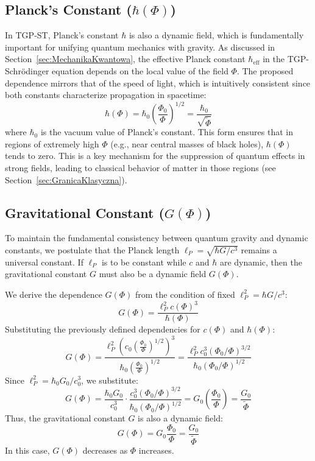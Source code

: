 \documentclass[11pt,a4paper]{article}
\begin{document}
\subsection{Planck’s Constant ($\hbar(\Phi)$)}
In TGP-ST, Planck’s constant $\hbar$ is also a dynamic field, which is fundamentally important for unifying quantum mechanics with gravity. As discussed in Section~\ref{sec:MechanikaKwantowa}, the effective Planck constant $\hbar_{\text{eff}}$ in the TGP-Schrödinger equation depends on the local value of the field $\Phi$. The proposed dependence mirrors that of the speed of light, which is intuitively consistent since both constants characterize propagation in spacetime:
\begin{equation}
    \hbar(\Phi) = \hbar_0 \left(\frac{\Phi_0}{\Phi}\right)^{1/2} = \frac{\hbar_0}{\sqrt{\tilde{\Phi}}}
    \label{eq:hbarPhi}
\end{equation}
where $\hbar_0$ is the vacuum value of Planck’s constant. This form ensures that in regions of extremely high $\Phi$ (e.g., near central masses of black holes), $\hbar(\Phi)$ tends to zero. This is a key mechanism for the suppression of quantum effects in strong fields, leading to classical behavior of matter in those regions (see Section~\ref{sec:GranicaKlasyczna}).

\subsection{Gravitational Constant ($G(\Phi)$)}
To maintain the fundamental consistency between quantum gravity and dynamic constants, we postulate that the Planck length $\ell_P = \sqrt{\hbar G / c^3}$ remains a universal constant. If $\ell_P$ is to be constant while $c$ and $\hbar$ are dynamic, then the gravitational constant $G$ must also be a dynamic field $G(\Phi)$.

We derive the dependence $G(\Phi)$ from the condition of fixed $\ell_P^2 = \hbar G / c^3$:
\[
    G(\Phi) = \frac{\ell_P^2 c(\Phi)^3}{\hbar(\Phi)}
\]
Substituting the previously defined dependencies for $c(\Phi)$ and $\hbar(\Phi)$:
\[
    G(\Phi) = \frac{\ell_P^2 \left(c_0 \left(\frac{\Phi_0}{\Phi}\right)^{1/2}\right)^3}{\hbar_0 \left(\frac{\Phi_0}{\Phi}\right)^{1/2}} 
    = \frac{\ell_P^2 c_0^3 (\Phi_0/\Phi)^{3/2}}{\hbar_0 (\Phi_0/\Phi)^{1/2}}
\]
Since $\ell_P^2 = \hbar_0 G_0 / c_0^3$, we substitute:
\[
    G(\Phi) = \frac{\hbar_0 G_0}{c_0^3} \cdot \frac{c_0^3 (\Phi_0/\Phi)^{3/2}}{\hbar_0 (\Phi_0/\Phi)^{1/2}} = G_0 \left(\frac{\Phi_0}{\Phi}\right) = \frac{G_0}{\tilde{\Phi}}
\]
Thus, the gravitational constant $G$ is also a dynamic field:
\begin{equation}
    G(\Phi) = G_0 \frac{\Phi_0}{\Phi} = \frac{G_0}{\tilde{\Phi}}
    \label{eq:GPhi}
\end{equation}
In this case, $G(\Phi)$ decreases as $\Phi$ increases.
\end{document}
